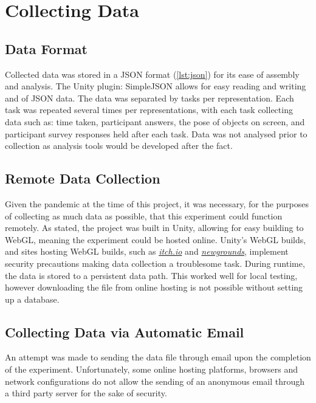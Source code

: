 \documentclass{l4proj}
\begin{document}
\section{Collecting Data}

\subsection{Data Format}

Collected data was stored in a JSON format (\cref{lst:json}) for its ease of assembly and analysis. The Unity plugin: SimpleJSON \citep{bunny83_simplejson_nodate} allows for easy reading and writing and of JSON data.
The data was separated by tasks per representation. Each task was repeated several times per representations, with each task collecting data such as: time taken, participant answers, the pose of objects on screen, and participant survey responses held after each task. Data was not analysed prior to collection as analysis tools would be developed after the fact.

\subsection{Remote Data Collection}

Given the pandemic at the time of this project, it was necessary, for the purposes of collecting as much data as possible, that this experiment could function remotely. As stated, the project was built in Unity, allowing for easy building to WebGL, meaning the experiment could be hosted online. Unity's WebGL builds, and sites hosting WebGL builds, such as \href{https://itch.io/}{\textit{itch.io}} and \href{https://www.newgrounds.com/}{\textit{newgrounds}}, implement security precautions making data collection a troublesome task.
During runtime, the data is stored to a persistent data path. This worked well for local testing, however downloading the file from online hosting is not possible without setting up a database.

\subsection*{Collecting Data via Automatic Email}

An attempt was made to sending the data file through email upon the completion of the experiment. Unfortunately, some online hosting platforms, browsers and network configurations do not allow the sending of an anonymous email through a third party server for the sake of security. 
\end{document}

